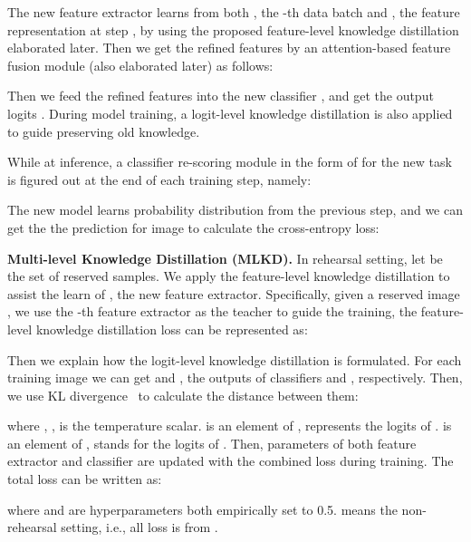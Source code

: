 \documentclass[letterpaper]{article} \usepackage{aaai23}  \usepackage{times}  \usepackage{helvet}  \usepackage{courier}  \usepackage[hyphens]{url}  \usepackage{graphicx} \urlstyle{rm} \def\UrlFont{\rm}  \usepackage{natbib}  \usepackage{caption} \frenchspacing  \setlength{\pdfpagewidth}{8.5in}  \setlength{\pdfpageheight}{11in}  \usepackage{algorithm}
\begin{document}
The new feature extractor  learns from both , the -th data batch and , the feature representation at step , by using the proposed feature-level knowledge distillation elaborated later. Then we get the refined features   by an attention-based feature fusion module  (also elaborated later) as follows:

Then we feed the refined features  into the new classifier , and get the output logits . During model training, a logit-level knowledge distillation is also applied to guide  preserving old knowledge.

While at inference, a classifier re-scoring module in the form of  for the new task is figured out at the end of each training step, namely:

The new model learns probability distribution from the previous step, and we can get the the prediction  for image  to calculate the cross-entropy loss:


\noindent\textbf{Multi-level Knowledge Distillation (MLKD).}
In rehearsal setting, let  be the set of reserved samples. We apply the feature-level knowledge distillation to assist the learn of , the new feature extractor. Specifically, given a reserved image , we use the -th feature extractor  as the teacher to guide the training, the feature-level knowledge distillation loss can be represented as:



Then we explain how the logit-level knowledge distillation is formulated. For each training image   we can get  and , the outputs of classifiers  and , respectively. Then, we use KL divergence~\cite{r23} to calculate the distance between them:


where , ,  is the temperature scalar.  is an element of ,  represents the logits of .  is an element of ,  stands for the logits of . Then, parameters of both feature extractor  and classifier  are updated with the combined loss during training. The total loss can be written as:

where  and  are hyperparameters both empirically set to 0.5.  means the non-rehearsal setting, i.e., all loss is from .
\end{document}
